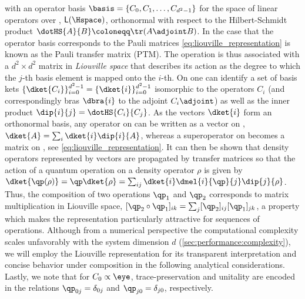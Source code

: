 with an operator basis $\basis=\lbrace C_0, C_1, \dotsc, C_{d^2-1}\rbrace$ for the space of linear operators over \Hspace, $\mathsf{L}(\Hspace)$, orthonormal with respect to the Hilbert-Schmidt product $\dotHS{A}{B}\coloneqq\tr(A\adjoint B)$. In the case that the operator basis corresponds to the Pauli matrices \cref{eq:liouville_representation} is known as the Pauli transfer matrix (PTM). The operation \qp is thus associated with a $d^2\times d^2$ matrix in \emph{Liouville space} \Lspace that describes its action as the degree to which the $j$-th basis element is mapped onto the $i$-th. On \Lspace one can identify a set of basis kets $\lbrace\dket{C_i}\rbrace_{i=0}^{d^2-1} = \lbrace\dket{i}\rbrace_{i=0}^{d^2-1}$ isomorphic to the operators $C_i$ (and correspondingly bras $\dbra{i}$ to the adjoint $C_i\adjoint$) as well as the inner product $\dip{i}{j} = \dotHS{C_i}{C_j}$. As the vectors $\dket{i}$ form an orthonormal basis, any operator on \Hspace can be written as a vector on \Lspace, $\dket{A} = \sum_i\dket{i}\dip{i}{A}$, whereas a superoperator on \Hspace becomes a matrix on \Lspace, see \cref{eq:liouville_representation}. It can then be shown that density operators represented by vectors are propagated by transfer matrices so that the action of a quantum operation \qp on a density operator $\rho$ is given by $\dket{\qp(\rho)} = \qp\dket{\rho} = \sum_{ij}\dket{i}\dmel{i}{\qp}{j}\dip{j}{\rho}$. Thus, the composition of two operations $\qp_1$ and $\qp_2$ corresponds to matrix multiplication in Liouville space, $[\qp_2\circ\qp_1]_{ik} = \sum_j[\qp_2]_{ij}[\qp_1]_{jk}$, a property which makes the representation particularly attractive for sequences of operations. Although from a numerical perspective the computational complexity scales unfavorably with the system dimension $d$ (\cf \cref{sec:performance:complexity}),  we will employ the Liouville representation for its transparent interpretation and concise behavior under composition in the following analytical considerations. Lastly, we note that for $C_0\propto\eye$, trace-preservation and unitality are encoded in the relations $\qp_{0j} = \delta_{0j}$ and $\qp_{j0} = \delta_{j0}$, respectively.

